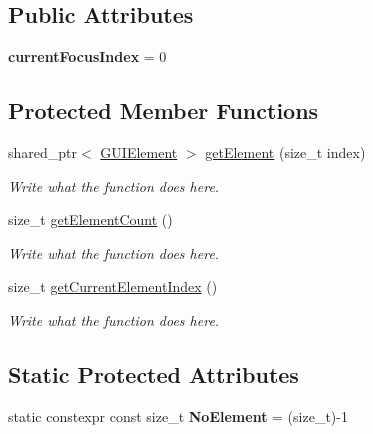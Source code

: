 \subsection*{Public Attributes}
\begin{DoxyCompactItemize}
\item 
\hypertarget{classGUIContainer_ae7711b8cd165b80e625306fe443a24a4}{{\bfseries current\+Focus\+Index} = 0}\label{classGUIContainer_ae7711b8cd165b80e625306fe443a24a4}

\end{DoxyCompactItemize}
\subsection*{Protected Member Functions}
\begin{DoxyCompactItemize}
\item 
shared\+\_\+ptr$<$ \hyperlink{classGUIElement}{G\+U\+I\+Element} $>$ \hyperlink{classGUIContainer_aa284afbbc302222ac9bff04fba9bfe4e}{get\+Element} (size\+\_\+t index)
\begin{DoxyCompactList}\small\item\em Write what the function does here. \end{DoxyCompactList}\item 
size\+\_\+t \hyperlink{classGUIContainer_a65c0f2e73c3f02ea936cb37447dba04b}{get\+Element\+Count} ()
\begin{DoxyCompactList}\small\item\em Write what the function does here. \end{DoxyCompactList}\item 
size\+\_\+t \hyperlink{classGUIContainer_a2e29a0e330951f3dd35b7b81c39b5a65}{get\+Current\+Element\+Index} ()
\begin{DoxyCompactList}\small\item\em Write what the function does here. \end{DoxyCompactList}\end{DoxyCompactItemize}
\subsection*{Static Protected Attributes}
\begin{DoxyCompactItemize}
\item 
\hypertarget{classGUIContainer_a530b15ff8ab84f7a4357b5714da3c16b}{static constexpr const size\+\_\+t {\bfseries No\+Element} = (size\+\_\+t)-\/1}\label{classGUIContainer_a530b15ff8ab84f7a4357b5714da3c16b}

\end{DoxyCompactItemize}
